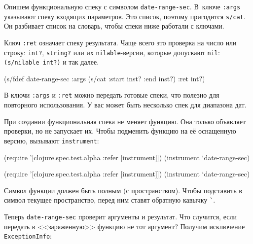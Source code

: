 Опишем функциональную спеку с символом \verb|date-range-sec|. В~ключе
\verb|:args| указывают спеку входящих параметров. Это список, поэтому пригодится
\verb|s/cat|. Он разбивает список на словарь, чтобы спеки ниже работали с
ключами.

Ключ \verb|:ret| означает спеку результата. Чаще всего это проверка на число или
строку: \verb|int?|, \verb|string?| или их \verb|nilable|-версии, которые
допускают \verb|nil|: \verb|(s/nilable int?)| и так далее.


\begin{english}
  \begin{clojure}
(s/fdef date-range-sec
  :args (s/cat :start inst? :end inst?)
  :ret int?)
  \end{clojure}
\end{english}

В ключи \verb|:args| и \verb|:ret| можно передать готовые спеки, что полезно
для повторного использования. У вас может быть несколько спек для диапазона дат.

При создании функциональная спека не меняет функцию. Она только объявляет
проверки, но не запускает их. Чтобы подменить функцию на её оснащенную версию,
вызывают \verb|instrument|:

\ifx\DEVICETYPE\MOBILE

\begin{english}
  \begin{clojure}
(require '[clojure.spec.test.alpha
           :refer [instrument]])
(instrument `date-range-sec)
  \end{clojure}
\end{english}

\else

\begin{english}
  \begin{clojure}
(require '[clojure.spec.test.alpha :refer [instrument]])
(instrument `date-range-sec)
  \end{clojure}
\end{english}

\fi


Символ функции должен быть полным (с пространством). Чтобы подставить в символ
текущее пространство, перед ним ставят обратную кавычку \verb|`|.

Теперь \verb|date-range-sec| проверит аргументы и результат. Что случится,
если передать в <<заряженную>> функцию не тот аргумент? Получим исключение
\verb|ExceptionInfo|:


